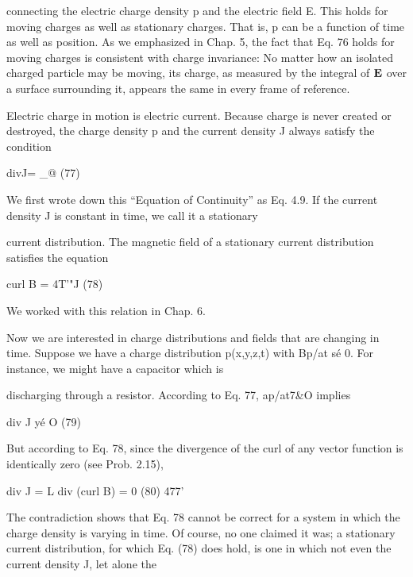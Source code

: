 connecting the electric charge density p and the electric field E. This
holds for moving charges as well as stationary charges. That is, p can
be a function of time as well as position. As we emphasized in
Chap. 5, the fact that Eq. 76 holds for moving charges is consistent
with charge invariance: No matter how an isolated charged particle
may be moving, its charge, as measured by the integral of $\mathbf{E}$ over a
surface surrounding it, appears the same in every frame of reference.

Electric charge in motion is electric current. Because charge is
never created or destroyed, the charge density p and the current
density J always satisfy the condition

\begin{equation}
\end{equation}
divJ= _@ (77)

We first wrote down this ``Equation of Continuity'' as Eq. 4.9.
If the current density J is constant in time, we call it a stationary

current distribution. The magnetic field of a stationary current distribution
satisfies the equation

\begin{equation}
\end{equation}
curl B = 4T'"J (78)

We worked with this relation in Chap. 6.

Now we are interested in charge distributions and fields that are
changing in time. Suppose we have a charge distribution p(x,y,z,t)
with Bp/at sé 0. For instance, we might have a capacitor which is

discharging through a resistor. According to Eq. 77, ap/at7&O
implies

\begin{equation}
\end{equation}
div J yé O (79)

But according to Eq. 78, since the divergence of the curl of any
vector function is identically zero (see Prob. 2.15),

\begin{equation}
\end{equation}
div J = L div (curl B) = 0 (80)
477'

The contradiction shows that Eq. 78 cannot be correct for a system
in which the charge density is varying in time. Of course, no one
claimed it was; a stationary current distribution, for which Eq. (78)
does hold, is one in which not even the current density J, let alone the

